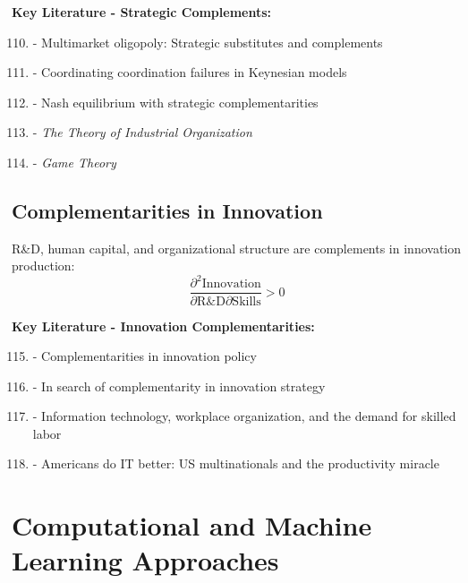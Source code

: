 \textbf{Key Literature - Strategic Complements:}
\begin{enumerate}[noitemsep]
    \setcounter{enumi}{109}
    \item \citet{bulow1985} - Multimarket oligopoly: Strategic substitutes and complements
    \item \citet{cooper1988} - Coordinating coordination failures in Keynesian models
    \item \citet{vives1990} - Nash equilibrium with strategic complementarities
    \item \citet{tirole1988} - \textit{The Theory of Industrial Organization}
    \item \citet{fudenberg1991} - \textit{Game Theory}
\end{enumerate}

\subsection{Complementarities in Innovation}
\label{subsec:innovation}

\begin{finding}
R\&D, human capital, and organizational structure are complements in innovation production:
\begin{equation}
\frac{\partial^2 \text{Innovation}}{\partial \text{R\&D} \partial \text{Skills}} > 0
\end{equation}
\end{finding}

\textbf{Key Literature - Innovation Complementarities:}
\begin{enumerate}[noitemsep]
    \setcounter{enumi}{114}
    \item \citet{mohnen2005} - Complementarities in innovation policy
    \item \citet{cassiman2006} - In search of complementarity in innovation strategy
    \item \citet{bresnahan2002} - Information technology, workplace organization, and the demand for skilled labor
    \item \citet{bloom2012} - Americans do IT better: US multinationals and the productivity miracle
\end{enumerate}

\section{Computational and Machine Learning Approaches}
\label{sec:computational}

